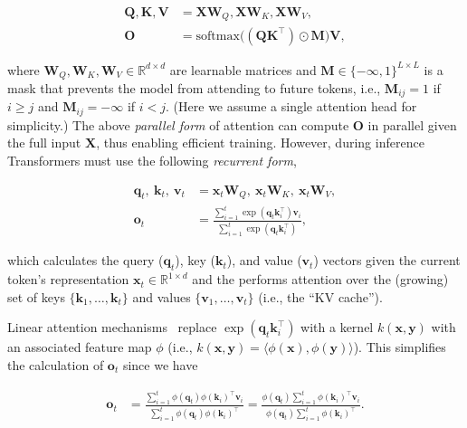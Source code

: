 \begin{align*}
{\mathbf{Q}}, {\mathbf{K}}, {\mathbf{V}} &= {\mathbf{X}} {\bm{W}}_Q, {\mathbf{X}} {\bm{W}}_K, {\mathbf{X}} {\bm{W}}_V, \\  {\mathbf{O}} &= \mathrm{softmax}\big(({\mathbf{Q}} {\mathbf{K}}^\intercal) \odot {\mathbf{M}} \big) {\mathbf{V}},

\end{align*}

where ${\bm{W}}_Q, {\bm{W}}_K, {\bm{W}}_V \in \mathbb{R}^{d \times d}$ are learnable matrices and 
${\mathbf{M}} \in \{-\infty,1\}^{L \times L}$ is a mask that prevents the model from attending to  future tokens, i.e., ${\mathbf{M}}_{ij}=1$ if $i\ge j$ and ${\mathbf{M}}_{ij}=-\infty$ if $i<j$. (Here we assume a single attention head for simplicity.) The above \textit{parallel form} of attention can compute ${\mathbf{O}}$ in parallel given the full input ${\mathbf{X}}$, thus enabling efficient training. However, during inference Transformers must use the following \emph{recurrent form},

\begin{align*}
{\bm{q}}_t, \ {\bm{k}}_t, \ {\bm{v}}_t &= {\bm{x}}_t {\bm{W}}_Q, \  {\bm{x}}_t {\bm{W}}_K, \ {\bm{x}}_t {\bm{W}}_V, \\ {\bm{o}}_t &= \frac{\sum_{i=1}^{t} \exp({\bm{q}}_t  {\bm{k}}_i^\intercal){\bm{v}}_i}{\sum_{i =1} ^{t} \exp({\bm{q}}_t  {\bm{k}}_i^\intercal)},
\end{align*}

which calculates the query (${\bm{q}}_t$), key (${\bm{k}}_t$), and value (${\bm{v}}_t$) vectors given the current token's representation ${\bm{x}}_t \in \mathbb{R}^{1 \times d}$ and the performs attention over the (growing) set of keys $\{{\bm{k}}_1, \dots, {\bm{k}}_t\}$ and values   $\{{\bm{v}}_1, \dots, {\bm{v}}_t\}$ (i.e., the ``KV cache''). 

Linear attention mechanisms~\citep{katharopoulos2020transformers} replace $\exp({\bm{q}}_t {\bm{k}}_i^\intercal)$ with a kernel $k({\bm{x}}, {\bm{y}})$ with an associated feature map $\phi$ (i.e., $k({\bm{x}}, {\bm{y}}) = \langle\phi({\bm{x}}), \phi({\bm{y}})\rangle$).  This simplifies the calculation of ${\bm{o}}_t$ since we have

\begin{align*}
 {\bm{o}}_t &= \frac{\sum_{i=1}^{ t}\phi({\bm{q}}_t)\phi({\bm{k}}_i)^\intercal {\bm{v}}_i}{\sum_{i=1}^{t} \phi({\bm{q}}_t)\phi({\bm{k}}_i)^\intercal  } = \frac{\phi({\bm{q}}_t)   \sum_{i=1}^{t}\phi({\bm{k}}_i)^\intercal {\bm{v}}_i}{\phi({\bm{q}}_t) \sum_{i=1}^{t}\phi({\bm{k}}_i)^\intercal}.

\end{align*}

